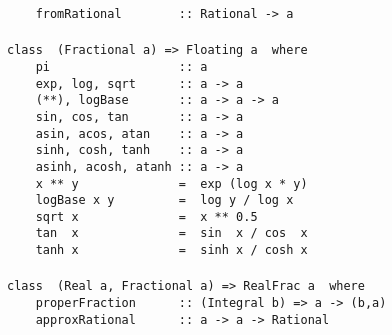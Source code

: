 \begin{figure}
{\mbox{\tt \ \ \ \ fromRational\ \ \ \ \ \ \ \ ::\ Rational\ ->\ a}\\
\mbox{\tt }\\[-8pt]
\mbox{\tt class\ \ (Fractional\ a)\ =>\ Floating\ a\ \ where}\\
\mbox{\tt \ \ \ \ pi\ \ \ \ \ \ \ \ \ \ \ \ \ \ \ \ \ \ ::\ a}\\
\mbox{\tt \ \ \ \ exp,\ log,\ sqrt\ \ \ \ \ \ ::\ a\ ->\ a}\\
\mbox{\tt \ \ \ \ (**),\ logBase\ \ \ \ \ \ \ ::\ a\ ->\ a\ ->\ a}\\
\mbox{\tt \ \ \ \ sin,\ cos,\ tan\ \ \ \ \ \ \ ::\ a\ ->\ a}\\
\mbox{\tt \ \ \ \ asin,\ acos,\ atan\ \ \ \ ::\ a\ ->\ a}\\
\mbox{\tt \ \ \ \ sinh,\ cosh,\ tanh\ \ \ \ ::\ a\ ->\ a}\\
\mbox{\tt \ \ \ \ asinh,\ acosh,\ atanh\ ::\ a\ ->\ a}\\
\mbox{\tt \ \ \ \ x\ **\ y\ \ \ \ \ \ \ \ \ \ \ \ \ \ =\ \ exp\ (log\ x\ *\ y)}\\
\mbox{\tt \ \ \ \ logBase\ x\ y\ \ \ \ \ \ \ \ \ =\ \ log\ y\ /\ log\ x}\\
\mbox{\tt \ \ \ \ sqrt\ x\ \ \ \ \ \ \ \ \ \ \ \ \ \ =\ \ x\ **\ 0.5}\\
\mbox{\tt \ \ \ \ tan\ \ x\ \ \ \ \ \ \ \ \ \ \ \ \ \ =\ \ sin\ \ x\ /\ cos\ \ x}\\
\mbox{\tt \ \ \ \ tanh\ x\ \ \ \ \ \ \ \ \ \ \ \ \ \ =\ \ sinh\ x\ /\ cosh\ x}\\
\mbox{\tt }\\[-8pt]
\mbox{\tt class\ \ (Real\ a,\ Fractional\ a)\ =>\ RealFrac\ a\ \ where}\\
\mbox{\tt \ \ \ \ properFraction\ \ \ \ \ \ ::\ (Integral\ b)\ =>\ a\ ->\ (b,a)}\\
\mbox{\tt \ \ \ \ approxRational\ \ \ \ \ \ ::\ a\ ->\ a\ ->\ Rational}
}
\label{basic-numeric-1}
\indextt{+}\indextt{-}\indextt{*}
\indextt{/}       
\indextt{**}
\end{figure}

